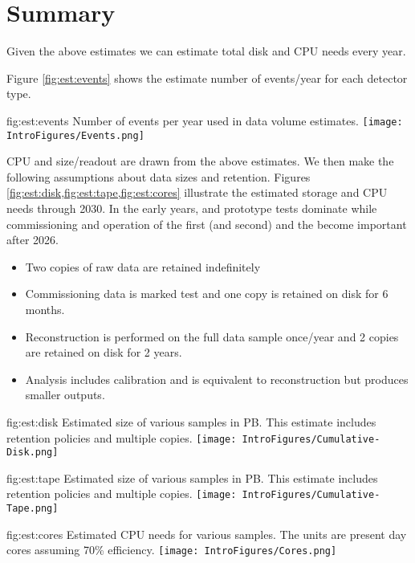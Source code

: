 \documentclass[../main-00.tex]{subfiles}
\begin{document}
\section{Summary}
\label{sec:est:volumes}

Given the above estimates we can  estimate total disk and CPU needs every year.

Figure \ref{fig:est:events} shows the estimate number of events/year for each detector type.  

\begin{dunefigure}
{fig:est:events}
{Number of events per year used in data volume estimates. }
\texttt{[image: IntroFigures/Events.png]}
\end{dunefigure}

CPU and size/readout are drawn from the above estimates. We then make the following assumptions about data sizes and retention.  
Figures \ref{fig:est:disk,fig:est:tape,fig:est:cores} illustrate the estimated storage and CPU needs through 2030.  In the early years,  and  prototype tests dominate while commissioning and operation of the first (and second)  and the  become important after 2026. 

\begin{itemize}
\item Two copies of raw data are retained indefinitely
\item Commissioning data is marked test and one copy is retained on disk for 6 months. 
\item Reconstruction is performed on the full data sample once/year and 2 copies are retained on disk for 2 years.  
\item Analysis includes calibration and is  equivalent to reconstruction but produces smaller outputs. 
\end{itemize}

\begin{dunefigure}
{fig:est:disk}
{Estimated size of various samples in PB. This estimate includes retention policies and multiple copies.}
\texttt{[image: IntroFigures/Cumulative-Disk.png]}
\end{dunefigure}

\begin{dunefigure}
{fig:est:tape}
{Estimated size of various samples in PB. This estimate includes retention policies and multiple copies.}
\texttt{[image: IntroFigures/Cumulative-Tape.png]}
\end{dunefigure}

\begin{dunefigure}
{fig:est:cores}
{Estimated CPU needs for  various samples.  The units are present day cores assuming 70\% efficiency.}
\texttt{[image: IntroFigures/Cores.png]}
\end{dunefigure}
\end{document}
